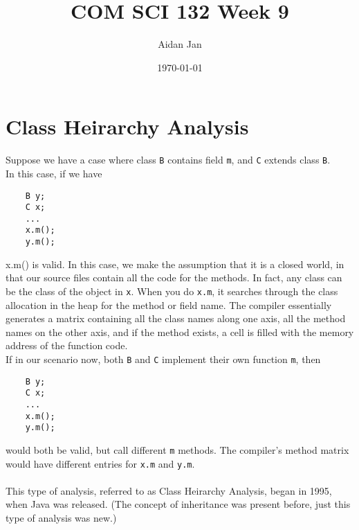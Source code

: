\documentclass[10pt]{article}
\title{COM SCI 132 Week 9}
\author{Aidan Jan}
\date{\today}
\begin{document}
\maketitle

\section*{Class Heirarchy Analysis}
Suppose we have a case where class \texttt{B} contains field \texttt{m}, and \texttt{C} extends class \texttt{B}.\\
In this case, if we have
\begin{verbatim}
    B y;
    C x;
    ...
    x.m();
    y.m();
\end{verbatim}
x.m() is valid.  In this case, we make the assumption that it is a closed world, in that our source files contain all the code for the methods.
In fact, any class can be the class of the object in \texttt{x}.  When you do \texttt{x.m}, it searches through the class allocation in the heap for the method or field name.  The compiler essentially generates a matrix containing all the class names along one axis, all the method names on the other axis, and if the method exists, a cell is filled with the memory address of the function code.\\
If in our scenario now, both \texttt{B} and \texttt{C} implement their own function \texttt{m}, then
\begin{verbatim}
    B y;
    C x;
    ...
    x.m();
    y.m();
\end{verbatim}
would both be valid, but call different \texttt{m} methods.  The compiler's method matrix would have different entries for \texttt{x.m} and \texttt{y.m}.\\\\
This type of analysis, referred to as Class Heirarchy Analysis, began in 1995, when Java was released.  (The concept of inheritance was present before, just this type of analysis was new.)
\end{document}
